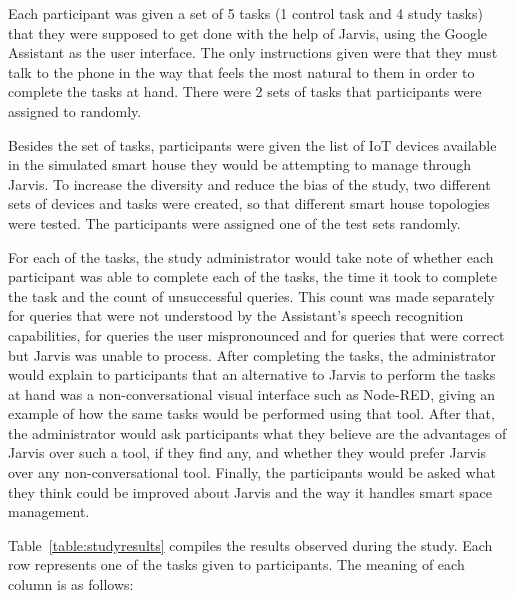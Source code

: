 \documentclass[runningheads]{llncs}
\begin{document}
Each participant was given a set of 5 tasks (1 control task and 4 study tasks) that they were supposed to get done with the help of Jarvis, using the Google Assistant as the user interface. The only instructions given were that they must talk to the phone in the way that feels the most natural to them in order to complete the tasks at hand. There were 2 sets of tasks that participants were assigned to randomly.

Besides the set of tasks, participants were given the list of IoT devices available in the simulated smart house they would be attempting to manage through Jarvis. To increase the diversity and reduce the bias of the study, two different sets of devices and tasks were created, so that different smart house topologies were tested. The participants were assigned one of the test sets randomly.

For each of the tasks, the study administrator would take note of whether each participant was able to complete each of the tasks, the time it took to complete the task and the count of unsuccessful queries. This count was made separately for queries that were not understood by the Assistant's speech recognition capabilities, for queries the user mispronounced and for queries that were correct but Jarvis was unable to process. After completing the tasks, the administrator would explain to participants that an alternative to Jarvis to perform the tasks at hand was a non-conversational visual interface such as Node-RED, giving an example of how the same tasks would be performed using that tool. After that, the administrator would ask participants what they believe are the advantages of Jarvis over such a tool, if they find any, and whether they would prefer Jarvis over any non-conversational tool. Finally, the participants would be asked what they think could be improved about Jarvis and the way it handles smart space management.

Table~\ref{table:studyresults} compiles the results observed during the study. Each row represents one of the tasks given to participants. The meaning of each column is as follows:
\end{document}
